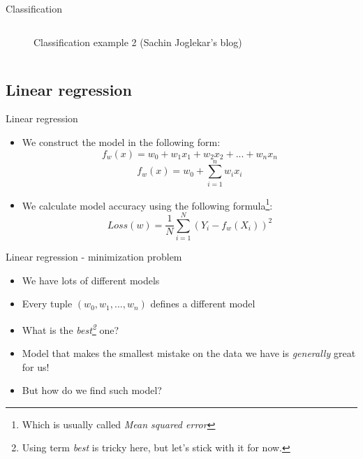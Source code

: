 \documentclass[aspectratio=169]{beamer}
\begin{document}
\begin{frame}{Classification}
\begin{columns}
\begin{column}{0.5\textwidth}
\begin{center}
\begin{figure}
                \caption{Classification example 2 (Sachin Joglekar's blog)}
            \end{figure}
        \end{center}
    \end{column}
    \end{columns}
\end{frame}
\subsection{Linear regression}
\begin{frame}{Linear regression}
    \begin{itemize}
        \item We construct the model in the following form:
        $$ f_w(x) = w_0 + w_1x_1 + w_2x_2 + ... + w_nx_n $$
        $$ f_w(x) = w_0 + \sum_{i=1}^{n} w_ix_i $$
    \item We calculate model accuracy using the following formula\footnote{Which is usually called \textit{Mean squared error}}:
        $$ Loss(w) = \frac{1}{N} \sum_{i=1}^{N} (Y_i - f_w(X_i))^ 2 $$
    \end{itemize}
\end{frame}
\begin{frame}{Linear regression - minimization problem}
    \begin{itemize}
        \item We have lots of different models
        \item Every tuple $(w_0, w_1, ..., w_n)$ defines a different model
        \item What is the \textit{best\footnote{Using term \textit{best} is tricky here, but let's stick with it for now.}} one?
        \item Model that makes the smallest mistake on the data we have is \textit{generally} great for us!
        \item But how do we find such model?
    \end{itemize}
\end{frame}
\end{document}
